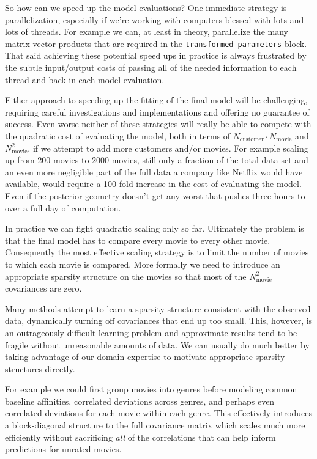 \documentclass[
  letterpaper,
  DIV=11,
  numbers=noendperiod]{scrartcl}
\begin{document}
So how can we speed up the model evaluations? One immediate strategy is
parallelization, especially if we're working with computers blessed with
lots and lots of threads. For example we can, at least in theory,
parallelize the many matrix-vector products that are required in the
\texttt{transformed\ parameters} block. That said achieving these
potential speed ups in practice is always frustrated by the subtle
input/output costs of passing all of the needed information to each
thread and back in each model evaluation.

Either approach to speeding up the fitting of the final model will be
challenging, requiring careful investigations and implementations and
offering no guarantee of success. Even worse neither of these strategies
will really be able to compete with the quadratic cost of evaluating the
model, both in terms of \(N_{\text{customer}} \cdot N_{\text{movie}}\)
and \(N_{\text{movie}}^{2}\), if we attempt to add more customers and/or
movies. For example scaling up from 200 movies to 2000 movies, still
only a fraction of the total data set and an even more negligible part
of the full data a company like Netflix would have available, would
require a 100 fold increase in the cost of evaluating the model. Even if
the posterior geometry doesn't get any worst that pushes three hours to
over a full day of computation.

In practice we can fight quadratic scaling only so far. Ultimately the
problem is that the final model has to compare every movie to every
other movie. Consequently the most effective scaling strategy is to
limit the number of movies to which each movie is compared. More
formally we need to introduce an appropriate sparsity structure on the
movies so that most of the \(N_{\text{movie}}^{2}\) covariances are
zero.

Many methods attempt to learn a sparsity structure consistent with the
observed data, dynamically turning off covariances that end up too
small. This, however, is an outrageously difficult learning problem and
approximate results tend to be fragile without unreasonable amounts of
data. We can usually do much better by taking advantage of our domain
expertise to motivate appropriate sparsity structures directly.

For example we could first group movies into genres before modeling
common baseline affinities, correlated deviations across genres, and
perhaps even correlated deviations for each movie within each genre.
This effectively introduces a block-diagonal structure to the full
covariance matrix which scales much more efficiently without sacrificing
\emph{all} of the correlations that can help inform predictions for
unrated movies.
\end{document}
